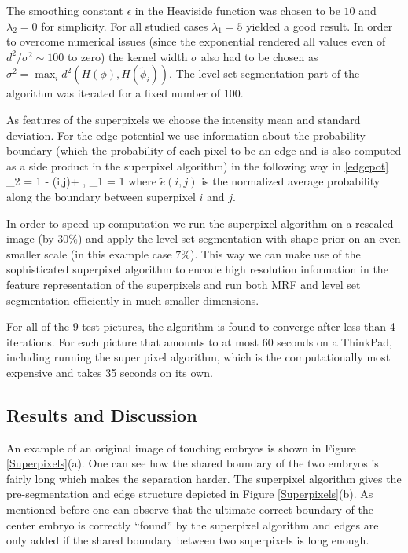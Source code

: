 \documentclass{article} %
\begin{document}
The smoothing constant $\epsilon$ in the Heaviside function was chosen to be $10$ and $\lambda_2 =0$ for simplicity. %
For all studied cases $\lambda_1 = 5$ yielded a good result.  In order to overcome numerical issues (since the exponential rendered all values even of $d^2/\sigma^2 \sim 100$ to zero) the kernel width $\sigma$ also had to be chosen as $\sigma^2 = \max_i d^2(H(\phi),H(\tilde{\phi}_i))$. The level set segmentation part of the algorithm was iterated for a fixed number of 100.

As features of the superpixels we choose the intensity mean and standard deviation. For the edge potential we use information about the probability boundary (which the probability of each pixel to be an edge and is also computed as a side product in the superpixel algorithm) in the following way in \eqref{edgepot}
\beqs
\theta_2 = 1 - (i,j)+ \epsilon, \: \theta_1 = 1
\eeqs
where $\tilde{e}(i,j)$ is the normalized average probability along the boundary between superpixel $i$ and $j$.


In order to speed up computation we run the superpixel algorithm on a rescaled image (by $30\%$) and apply the level set segmentation with shape prior on an even smaller scale (in this example case $7\%$). This way we can make use of the sophisticated superpixel algorithm to encode high resolution information in the feature representation of the superpixels and run both MRF and level set segmentation efficiently in much smaller dimensions.

For all of the 9 test pictures, the algorithm is found to converge after less than 4 iterations. For each picture that amounts to at most 60 seconds on a ThinkPad, including running the super pixel algorithm, which is the computationally most expensive and takes 35 seconds on its own.


\subsection{Results and Discussion}

An example of an original image of touching embryos is shown in Figure \ref{Superpixels}(a). One can see how the shared boundary of the two embryos is fairly long which makes the separation harder.
The superpixel algorithm gives the pre-segmentation and edge structure depicted in Figure \ref{Superpixels}(b). As mentioned before one can observe that the ultimate correct boundary of the center embryo is correctly ``found'' by the superpixel algorithm and edges are only added if the shared boundary between two superpixels is long enough.
\end{document}
